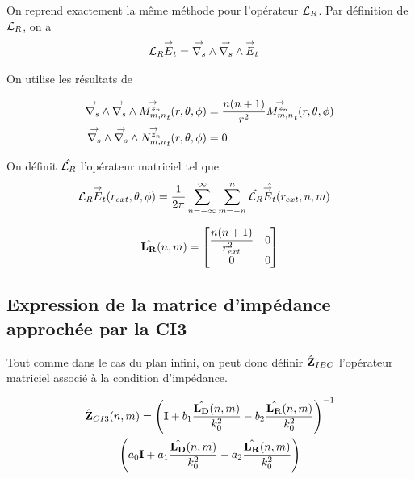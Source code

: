     On reprend exactement la même méthode pour l'opérateur \(\LR\).
    Par définition de \(\LR\), on a
    \begin{align}
      \LR \vE_t & = \vrots{} \vrots{} \vE_t
    \end{align}

    On utilise les résultats de \cite{marceaux_high-order_2000}

    \begin{align*}
      \vrots{}\vrots{} \Mmn[z_n]_t(r,\theta,\phi) &= \frac{n(n+1)}{r^2}\Mmn[z_n]_t(r,\theta,\phi)
      \\
      \vrots{}\vrots{} \Nmn[z_n]_t(r,\theta,\phi) &= 0
    \end{align*}

    On définit \(\hat{\LR}\) l'opérateur matriciel tel que
    \begin{align}
      \LR \vE_t(r_{ext},\theta,\phi)
      &= \frac{1}{2\pi}\sum_{n=-\infty}^\infty\sum_{m=-n}^n \hat{\LR} \hat{\vE_t}(r_{ext},n,m)
    \end{align}

    \begin{equation}
      \label{eq:sphere:fourier:LR}
      \hat{\mLR}(n,m) =
      \begin{bmatrix}
        \frac{n(n+1)}{r_{ext}^2} & 0
        \\
        0 & 0
      \end{bmatrix}
    \end{equation}

  \subsection{Expression de la matrice d'impédance approchée par la CI3}

    Tout comme dans le cas du plan infini, on peut donc définir \(\hat{\mZ}_{IBC}\) l’opérateur matriciel associé à la condition d'impédance.

    \begin{multline}
        \hat{\mZ}_{CI3}(n,m) = \left(\mI + b_1 \frac{\hat{\mLD}(n,m)}{k_0^2} - b_2 \frac{\hat{\mLR}(n,m)}{k_0^2} \right)^{-1}\\
        \left(a_0 \mI + a_1 \frac{\hat{\mLD}(n,m)}{k_0^2} - a_2 \frac{\hat{\mLR}(n,m)}{k_0^2}\right)
    \end{multline}
